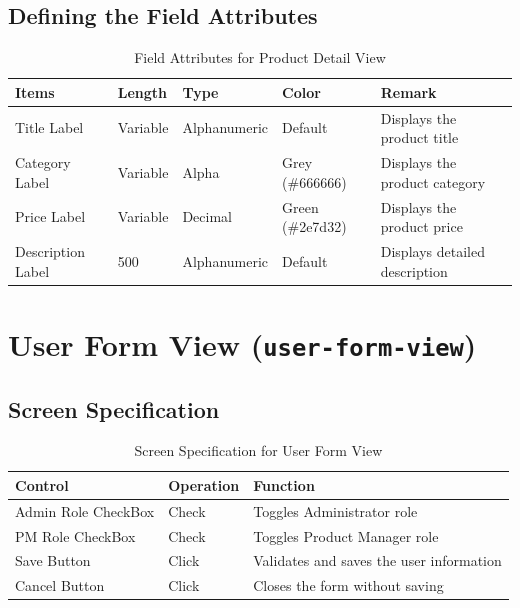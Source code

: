 \documentclass{article}
\begin{document}
\subsection{Defining the Field Attributes}
\begin{table}[h!]
\centering
\begin{tabularx}{\textwidth}{|l|l|l|l|X|}
\hline
\textbf{Items} & \textbf{Length} & \textbf{Type} & \textbf{Color} & \textbf{Remark} \\
\hline
Title Label & Variable & Alphanumeric & Default & Displays the product title \\
\hline
Category Label & Variable & Alpha & Grey (\#666666) & Displays the product category \\
\hline
Price Label & Variable & Decimal & Green (\#2e7d32) & Displays the product price \\
\hline
Description Label & 500 & Alphanumeric & Default & Displays detailed description \\
\hline
\end{tabularx}
\caption{Field Attributes for Product Detail View}
\end{table}

\section{User Form View (\texttt{user-form-view})}
\subsection{Screen Specification}
\begin{table}[h!]
\centering
\begin{tabularx}{\textwidth}{|l|l|X|}
\hline
\textbf{Control} & \textbf{Operation} & \textbf{Function} \\
\hline
Admin Role CheckBox & Check & Toggles Administrator role \\
\hline
PM Role CheckBox & Check & Toggles Product Manager role \\
\hline
Save Button & Click & Validates and saves the user information \\
\hline
Cancel Button & Click & Closes the form without saving \\
\hline
\end{tabularx}
\caption{Screen Specification for User Form View}
\end{table}
\end{document}
